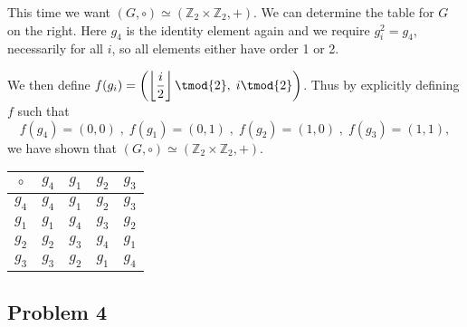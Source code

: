 \documentclass[../hw_sols.tex]{subfiles}
\begin{document}
\begin{description}
\begin{solution}

This time we want $(G,\circ) \simeq (\mathbb{Z}_2 \times \mathbb{Z}_2, +)$. 
We can determine the table for $G$ on the right. Here $g_4$ is the identity 
element again and we require $g_i^2 = g_4$, necessarily for all $i$, so all 
elements either have order 1 or 2. 

\begin{minipage}{0.65\linewidth}
We then define 
$\displaystyle f(g_i) = 
\left( 
	\left\lfloor \frac{i}{2} \right\rfloor \tmod{2}, \; i \tmod{2} 
\right)$.
Thus by explicitly defining $f$ such that
	$$f(g_4) = (0,0) \; , \; 
	f(g_1) = (0,1) \; , \; 
	f(g_2) = (1,0) \; , \; 
	f(g_3) = (1,1),$$
we have shown that $(G,\circ) \simeq (\mathbb{Z}_2 \times \mathbb{Z}_2, +)$.
\end{minipage}
\quad\quad
\begin{minipage}{0.25\linewidth}
\begin{tabular}{ c | c | c | c | c }
	$\circ$ & $g_4$ & $g_1$ & $g_2$ & $g_3$ \\
	\hline
	$g_4$ & $g_4$ & $g_1$ & $g_2$ & $g_3$ \\
	\hline
	$g_1$ & $g_1$ & $g_4$ & $g_3$ & $g_2$ \\
	\hline
	$g_2$ & $g_2$ & $g_3$ & $g_4$ & $g_1$ \\
	\hline
	$g_3$ & $g_3$ & $g_2$ & $g_1$ & $g_4$ \\
\end{tabular}
\end{minipage}

\end{solution}

\end{description}


\newpage



\subsection*{Problem 4}
\end{document}
